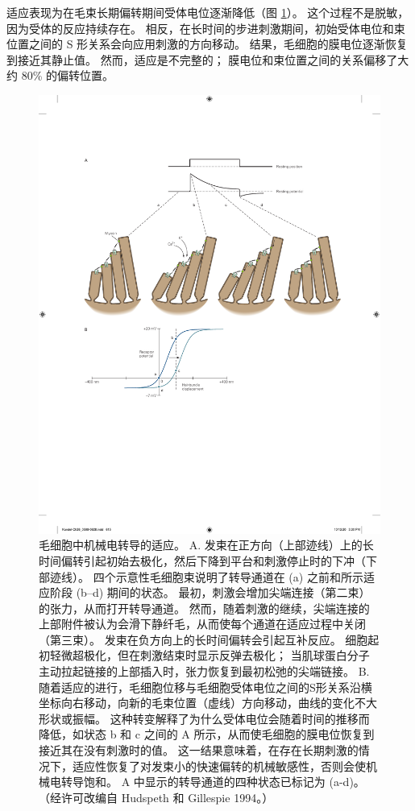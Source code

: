 适应表现为在毛束长期偏转期间受体电位逐渐降低（图 \ref{fig:26_12}）。 
这个过程不是脱敏，因为受体的反应持续存在。 
相反，在长时间的步进刺激期间，初始受体电位和束位置之间的 S 形关系会向应用刺激的方向移动。 
结果，毛细胞的膜电位逐渐恢复到接近其静止值。 然而，适应是不完整的； 膜电位和束位置之间的关系偏移了大约 80\% 的偏转位置。

\begin{figure}[htbp]
	\centering
	\includegraphics[width=0.95\linewidth]{chap26/fig_26_12}
	\caption{毛细胞中机械电转导的适应。 A. 发束在正方向（上部迹线）上的长时间偏转引起初始去极化，然后下降到平台和刺激停止时的下冲（下部迹线）。 四个示意性毛细胞束说明了转导通道在 (a) 之前和所示适应阶段 (b–d) 期间的状态。 最初，刺激会增加尖端连接（第二束）的张力，从而打开转导通道。 然而，随着刺激的继续，尖端连接的上部附件被认为会滑下静纤毛，从而使每个通道在适应过程中关闭（第三束）。 发束在负方向上的长时间偏转会引起互补反应。 细胞起初轻微超极化，但在刺激结束时显示反弹去极化； 当肌球蛋白分子主动拉起链接的上部插入时，张力恢复到最初松弛的尖端链接。 B. 随着适应的进行，毛细胞位移与毛细胞受体电位之间的S形关系沿横坐标向右移动，向新的毛束位置（虚线）方向移动，曲线的变化不大 形状或振幅。 这种转变解释了为什么受体电位会随着时间的推移而降低，如状态 b 和 c 之间的 A 所示，从而使毛细胞的膜电位恢复到接近其在没有刺激时的值。 这一结果意味着，在存在长期刺激的情况下，适应性恢复了对发束小的快速偏转的机械敏感性，否则会使机械电转导饱和。 A 中显示的转导通道的四种状态已标记为 (a-d)。 （经许可改编自 Hudspeth 和 Gillespie 1994。）}
	\label{fig:26_12}
\end{figure}


